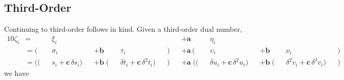 \documentclass[11pt]{article}
\begin{document}
\subsection*{Third-Order}

Continuing to third-order follows in kind.  Given a third-order dual number,
%
\begin{alignat*}{10}
\zeta_{i} 
&=
&& \xi_{i} && && &&
&&+ \mathbf{a} \, 
&& \eta_{i} && && &&
\\
&=
( && \sigma_{i} && + \mathbf{b} && \tau_{i} &&)
&&+ \mathbf{a} \,
( && \upsilon_{i} && + \mathbf{b} && \nu_{i} && )
\\
&=
(( && s_{i} + \mathbf{c} \, \delta s_{i} )
&& + \mathbf{b} \;
( && \delta t_{i} + \mathbf{c} \, \delta^{2} t_{i}  ) &&)
&&+ \mathbf{a} \;
(( && \delta u_{i} + \mathbf{c} \, \delta^{2} u_{i} )
&& + \mathbf{b} \;
( && \delta^{2} v_{i} + \mathbf{c} \, \delta^{3} v_{i} ) &&)
\end{alignat*}
%
we have
%
\end{document}
